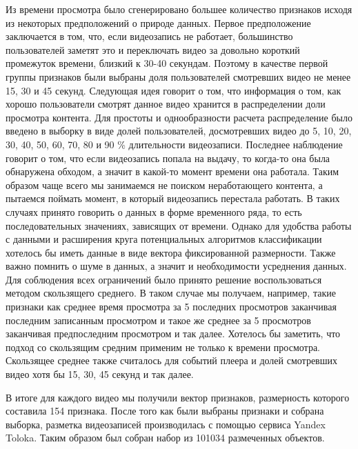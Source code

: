 Из времени просмотра было сгенерировано большее количество признаков исходя из некоторых предположений о природе данных. Первое предположение заключается в том, что, если видеозапись не работает, большинство пользователей заметят это и переключать видео за довольно короткий промежуток времени, близкий к 30-40 секундам. Поэтому в качестве первой группы признаков были выбраны доля пользователей смотревших видео не менее 15, 30 и 45 секунд. Следующая идея говорит о том, что информация о том, как хорошо пользователи смотрят данное видео хранится в распределении доли просмотра контента. Для простоты и однообразности расчета распределение было введено в выборку в виде долей пользователей, досмотревших видео до 5, 10, 20, 30, 40, 50, 60, 70, 80 и 90 \% длительности видеозаписи. Последнее наблюдение говорит о том, что если видеозапись попала на выдачу, то когда-то она была обнаружена обходом, а значит в какой-то момент времени она работала. Таким образом чаще всего мы занимаемся не поиском неработающего контента, а пытаемся поймать момент, в который видеозапись перестала работать. В таких случаях принято говорить о данных в форме временного ряда, то есть последовательных значениях, зависящих от времени. Однако для удобства работы с данными и расширения круга потенциальных алгоритмов классификации хотелось бы иметь данные в виде вектора фиксированной размерности. Также важно помнить о шуме в данных, а значит и необходимости усреднения данных. Для соблюдения всех ограничений было принято решение воспользоваться методом скользящего среднего. В таком случае мы получаем, например, такие признаки как среднее время просмотра за 5 последних просмотров заканчивая последним записанным просмотром и такое же среднее за 5 просмотров заканчивая предпоследним просмотром и так далее. Хотелось бы заметить, что подход со скользящим средним применим не только к времени просмотра. Скользящее среднее также считалось для событий плеера и долей смотревших видео хотя бы 15, 30, 45 секунд и так далее.

В итоге для каждого видео мы получили вектор признаков, размерность которого составила 154 признака. После того как были выбраны признаки и собрана выборка, разметка видеозаписей производилась с помощью сервиса Yandex Toloka. Таким образом был собран набор из 101034 размеченных объектов.